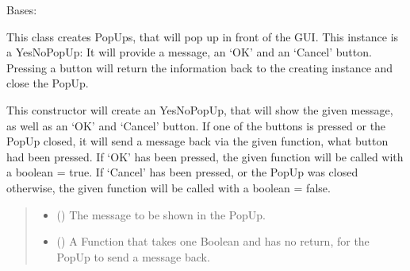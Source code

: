 \documentclass[letterpaper,10pt,english]{sphinxmanual}
\begin{document}
\begin{fulllineitems}
\label{\detokenize{apidoc/src.osm_configurator.view.popups:src.osm_configurator.view.popups.yes_no_pop_up.YesNoPopUp}}
\pysigstartsignatures
{}
\pysigstopsignatures
\sphinxAtStartPar
Bases: 

\sphinxAtStartPar
This class creates PopUps, that will pop up in front of the GUI.
This instance is a YesNoPopUp: It will provide a message, an ‘OK’ and an ‘Cancel’ button.
Pressing a button will return the information back to the creating instance and close the PopUp.

\begin{fulllineitems}
\label{\detokenize{apidoc/src.osm_configurator.view.popups:src.osm_configurator.view.popups.yes_no_pop_up.YesNoPopUp.__init__}}
\pysigstartsignatures
{}
\pysigstopsignatures
\sphinxAtStartPar
This constructor will create an YesNoPopUp, that will show the given message, as well as an ‘OK’ and
‘Cancel’ button. If one of the buttons is pressed or the PopUp closed, it will send a message back via the
given function, what button had been pressed.
If ‘OK’ has been pressed, the given function will be called with a boolean = true.
If ‘Cancel’ has been pressed, or the PopUp was closed otherwise, the given function will be called with
a boolean = false.
\begin{quote}\begin{description}
\begin{itemize}
\item {} 
\sphinxAtStartPar
{} () \textendash{} The message to be shown in the PopUp.

\item {} 
\sphinxAtStartPar
{} () \textendash{} A Function that takes one Boolean and has no return, for the PopUp to send a message back.

\end{itemize}

\end{description}\end{quote}

\end{fulllineitems}


\end{fulllineitems}
\end{document}
